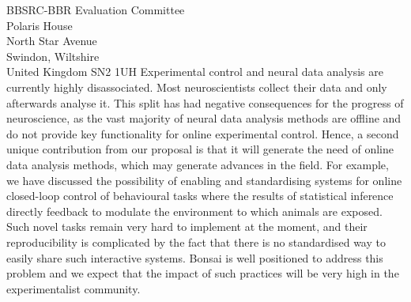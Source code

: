 \documentclass[12pt]{letter}
\begin{document}
\begin{letter}{
    BBSRC-BBR Evaluation Committee\\
    Polaris House\\
    North Star Avenue\\
    Swindon, Wiltshire\\
    United Kingdom SN2 1UH
}
Experimental control and neural data analysis are currently highly
disassociated. Most neuroscientists collect their data and only afterwards
analyse it. This split has had negative consequences for the progress of
neuroscience, as the vast majority of neural data analysis methods are offline
and do not provide key functionality for online experimental control. Hence, a
second unique contribution from our proposal is that it will generate the need
of online data analysis methods, which may generate advances in the field. For example, we have discussed the possibility of enabling and standardising systems for online closed-loop control of behavioural tasks where the results of statistical inference directly feedback to modulate the environment to which animals are exposed. Such novel tasks remain very hard to implement at the moment, and their reproducibility is complicated by the fact that there is no standardised way to easily share such interactive systems. Bonsai is well positioned to address this problem and we expect that the impact of such practices will be very high in the experimentalist community.

\end{letter}
\end{document}
